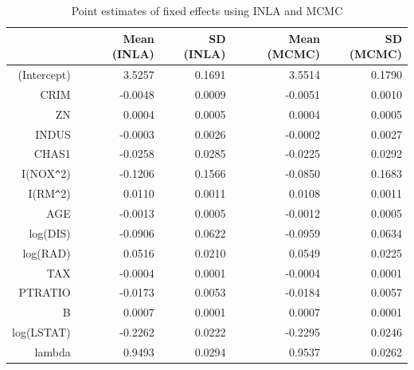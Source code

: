 \documentclass[article]{jss}
\begin{document}
\begin{table}[ht]
\centering
\begin{tabular}{rrrrr}
  \hline
 & Mean (INLA) & SD (INLA) & Mean (MCMC) & SD (MCMC) \\ 
  \hline
(Intercept) & 3.5257 & 0.1691 & 3.5514 & 0.1790 \\ 
  CRIM & -0.0048 & 0.0009 & -0.0051 & 0.0010 \\ 
  ZN & 0.0004 & 0.0005 & 0.0004 & 0.0005 \\ 
  INDUS & -0.0003 & 0.0026 & -0.0002 & 0.0027 \\ 
  CHAS1 & -0.0258 & 0.0285 & -0.0225 & 0.0292 \\ 
  I(NOX\verb|^|2) & -0.1206 & 0.1566 & -0.0850 & 0.1683 \\ 
  I(RM\verb|^|2) & 0.0110 & 0.0011 & 0.0108 & 0.0011 \\ 
  AGE & -0.0013 & 0.0005 & -0.0012 & 0.0005 \\ 
  log(DIS) & -0.0906 & 0.0622 & -0.0959 & 0.0634 \\ 
  log(RAD) & 0.0516 & 0.0210 & 0.0549 & 0.0225 \\ 
  TAX & -0.0004 & 0.0001 & -0.0004 & 0.0001 \\ 
  PTRATIO & -0.0173 & 0.0053 & -0.0184 & 0.0057 \\ 
  B & 0.0007 & 0.0001 & 0.0007 & 0.0001 \\ 
  log(LSTAT) & -0.2262 & 0.0222 & -0.2295 & 0.0246 \\ 
  lambda & 0.9493 & 0.0294 & 0.9537 & 0.0262 \\ 
   \hline
\end{tabular}
\caption{Point estimates of fixed effects using INLA and MCMC} 
\label{tab:leroux}
\end{table}
\end{document}
